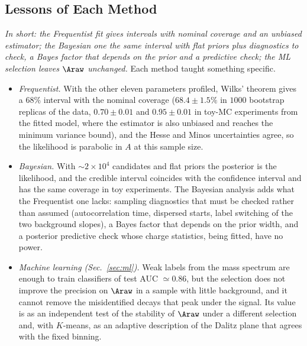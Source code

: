 \subsection{Lessons of Each Method}
\emph{In short: the Frequentist fit gives intervals with nominal coverage and an unbiased estimator; the Bayesian one the same interval with flat priors plus diagnostics to check, a Bayes factor that depends on the prior and a predictive check; the ML selection leaves $\Araw$ unchanged.}
Each method taught something specific.
\begin{itemize}[leftmargin=*,itemsep=2pt]
\item \emph{Frequentist.} With the other eleven parameters profiled, Wilks' theorem gives a $68\%$ interval with the nominal coverage ($68.4\pm1.5\%$ in $1000$ bootstrap replicas of the data, $0.70\pm0.01$ and $0.95\pm0.01$ in toy-MC experiments from the fitted model, where the estimator is also unbiased and reaches the minimum variance bound), and the Hesse and Minos uncertainties agree, so the likelihood is parabolic in $A$ at this sample size.
\item \emph{Bayesian.} With $\sim2\times10^4$ candidates and flat priors the posterior is the likelihood, and the credible interval coincides with the confidence interval and has the same coverage in toy experiments. The Bayesian analysis adds what the Frequentist one lacks: sampling diagnostics that must be checked rather than assumed (autocorrelation time, dispersed starts, label switching of the two background slopes), a Bayes factor that depends on the prior width, and a posterior predictive check whose charge statistics, being fitted, have no power.
\item \emph{Machine learning (Sec.~\ref{sec:ml}).} Weak labels from the mass spectrum are enough to train classifiers of test AUC $\simeq0.86$, but the selection does not improve the precision on $\Araw$ in a sample with little background, and it cannot remove the misidentified decays that peak under the signal. Its value is as an independent test of the stability of $\Araw$ under a different selection and, with $K$-means, as an adaptive description of the Dalitz plane that agrees with the fixed binning.
\end{itemize}
